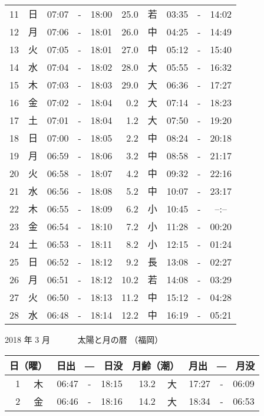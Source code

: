 \documentclass[a4j,10pt]{jsarticle}
\begin{document}
\begin{center}
\begin{table}[ht]
\begin{center}
\begin{tabular}{|rc|ccc|rc|ccc|}
 11 & 日 & 07:07 &-& 18:00 & 25.0 & 若 & 03:35 &-& 14:02 \\
 12 & 月 & 07:06 &-& 18:01 & 26.0 & 中 & 04:25 &-& 14:49 \\
 13 & 火 & 07:05 &-& 18:01 & 27.0 & 中 & 05:12 &-& 15:40 \\
 14 & 水 & 07:04 &-& 18:02 & 28.0 & 大 & 05:55 &-& 16:32 \\
 15 & 木 & 07:03 &-& 18:03 & 29.0 & 大 & 06:36 &-& 17:27 \\
 16 & 金 & 07:02 &-& 18:04 &  0.2 & 大 & 07:14 &-& 18:23 \\
 17 & 土 & 07:01 &-& 18:04 &  1.2 & 大 & 07:50 &-& 19:20 \\
 18 & 日 & 07:00 &-& 18:05 &  2.2 & 中 & 08:24 &-& 20:18 \\
 19 & 月 & 06:59 &-& 18:06 &  3.2 & 中 & 08:58 &-& 21:17 \\
 20 & 火 & 06:58 &-& 18:07 &  4.2 & 中 & 09:32 &-& 22:16 \\
 21 & 水 & 06:56 &-& 18:08 &  5.2 & 中 & 10:07 &-& 23:17 \\
 22 & 木 & 06:55 &-& 18:09 &  6.2 & 小 & 10:45 &-&  --:--  \\
 23 & 金 & 06:54 &-& 18:10 &  7.2 & 小 & 11:28 &-& 00:20 \\
 24 & 土 & 06:53 &-& 18:11 &  8.2 & 小 & 12:15 &-& 01:24 \\
 25 & 日 & 06:52 &-& 18:12 &  9.2 & 長 & 13:08 &-& 02:27 \\
 26 & 月 & 06:51 &-& 18:12 & 10.2 & 若 & 14:08 &-& 03:29 \\
 27 & 火 & 06:50 &-& 18:13 & 11.2 & 中 & 15:12 &-& 04:28 \\
 28 & 水 & 06:48 &-& 18:14 & 12.2 & 中 & 16:19 &-& 05:21 \\
    \hline
    \end{tabular}
    \end{center}
\end{table}
\newpage
  {\large 2018 年  3 月}
  {\Large 　　　太陽と月の暦   （福岡） }
  \begin{table}[ht]
  \begin{center}
     \begin{tabular}{|rc|ccc|rc|ccc|}
     \hline
     \multicolumn{2}{|c|}{日（曜）} & \multicolumn{3}{c|}{日出　―　日没} & \multicolumn{2}{c|}{月齢（潮）} & \multicolumn{3}{c|}{月出　―　月没}\\
     \hline
  1 & 木 & 06:47 &-& 18:15 & 13.2 & 大 & 17:27 &-& 06:09 \\
  2 & 金 & 06:46 &-& 18:16 & 14.2 & 大 & 18:34 &-& 06:53 \\

\end{tabular}
\end{center}
\end{table}
\end{center}
\end{document}
